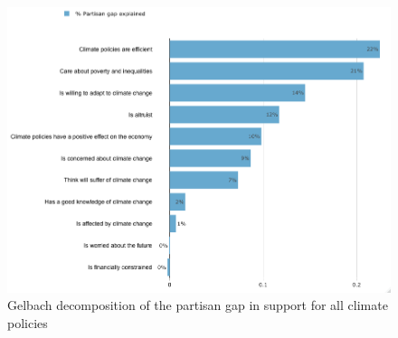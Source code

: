\documentclass{article}
\begin{document}
\begin{figure}[h!]
	\caption{Gelbach decomposition of the partisan gap in support for all climate policies}	
		\includegraphics[width=\textwidth]{gelbach_right_all_policies_D2SD}
\end{figure}
\end{document}
